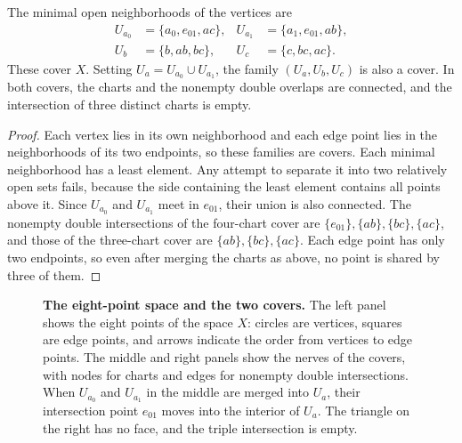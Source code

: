 \begin{lemma}\label{lem:2.38}

The minimal open neighborhoods of the vertices are
\begin{equation*}
\begin{aligned}
U_{a_0}&=\{a_0,e_{01},ac\},& U_{a_1}&=\{a_1,e_{01},ab\},\\
U_b&=\{b,ab,bc\},& U_c&=\{c,bc,ac\}.
\end{aligned}
\tag{2.24}\label{eq:2.24}
\end{equation*}
These cover $X$. Setting $U_a=U_{a_0}\cup U_{a_1}$, the family $(U_a,U_b,U_c)$ is also a
cover. In both covers, the charts and the nonempty double overlaps are connected, and the
intersection of three distinct charts is empty.

\end{lemma}

\begin{proof}

Each vertex lies in its own neighborhood and each edge point lies in the neighborhoods of
its two endpoints, so these families are covers. Each minimal neighborhood has a least
element. Any attempt to separate it into two relatively open sets fails, because the side
containing the least element contains all points above it. Since $U_{a_0}$ and $U_{a_1}$
meet in $e_{01}$, their union is also connected. The nonempty double intersections of the
four-chart cover are $\{e_{01}\},\{ab\},\{bc\},\{ac\}$, and those of the three-chart
cover are $\{ab\},\{bc\},\{ac\}$. Each edge point has only two endpoints, so even after
merging the charts as above, no point is shared by three of them.

\end{proof}

\begin{figure}[htbp]
\centering

\caption{\textbf{The eight-point space and the two covers.} The left panel shows the
eight points of the space $X$: circles are vertices, squares are edge points, and arrows
indicate the order from vertices to edge points. The middle and right panels show the
nerves of the covers, with nodes for charts and edges for nonempty double intersections.
When $U_{a_0}$ and $U_{a_1}$ in the middle are merged into $U_a$, their intersection
point $e_{01}$ moves into the interior of $U_a$. The triangle on the right has no face,
and the triple intersection is empty.}\label{fig:2.1}
\end{figure}

